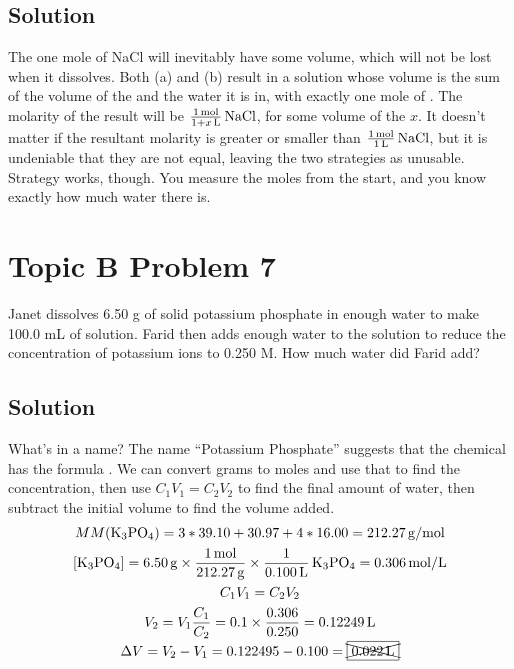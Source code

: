 \documentclass[10pt]{article}
\begin{document}
        \subsection{Solution}
            The one mole of NaCl will inevitably have some volume, which will not be lost when it dissolves.
            Both (a) and (b) result in a solution whose volume is the sum of the volume of the  and the water it is in, with exactly one mole of .
            The molarity of the result will be $\frac{1\,\unit{\mole}}{1 + x\,\unit{\liter}}\,\ce{NaCl}$, for some volume of the  $x$.
            It doesn't matter if the resultant molarity is greater or smaller than $\frac{1\,\unit{\mole}}{1\,\unit{\liter}}\,\ce{NaCl}$, but it is undeniable that they are not equal, leaving the two strategies as unusable.
            Strategy  works, though. You measure the moles from the start, and you know exactly how much water there is.

    \pagebreak
    \section{Topic B Problem 7}
        Janet dissolves 6.50 g of solid potassium phosphate in enough water to make 100.0 mL of solution. 
        Farid then adds enough water to the solution to reduce the concentration of potassium ions to 0.250 M. 
        How much water did Farid add?

        \subsection{Solution}
            What's in a name? 
            The name ``Potassium Phosphate'' suggests that the chemical has the formula .
            We can convert grams to moles and use that to find the concentration, then use $C_1 V_1 = C_2 V_2$ to find the final amount of water, then subtract the initial volume to find the volume added.
            \begin{gather}
                MM(\ce{K3PO4})  =   3 * 39.10 + 30.97 + 4 * 16.00
                    =   212.27\,\unit{\gram/\mole}\\
                \left[ \ce{K3PO4} \right]   =   6.50\,\unit{\gram}  \times  \frac{1\,\unit{\mole}}{212.27\,\unit{\gram}}
                                                                    \times  \frac{1}{0.100\,\unit{\liter}}  \,\ce{K3PO4}
                    =   0.306\,\unit{\mole/\liter}\\
                C_1 V_1 =   C_2 V_2\\
                V_2 =   V_1 \frac{C_1}{C_2}
                    =   0.1 \times \frac{0.306}{0.250}
                    =   0.12249\,\unit{\liter}\\
                \Delta V    =   V_2 - V_1
                    =   0.122495 - 0.100
                    =   \xcancel{\boxed{0.022\,\unit{\liter}}}
            \end{gather}
\end{document}
